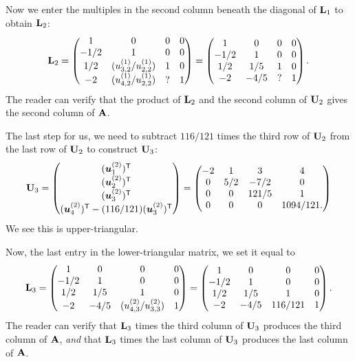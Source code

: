 Now we enter the multiples in the second column beneath the diagonal of
$\mathbf{L}_{1}$ to obtain $\mathbf{L}_{2}$:
\begin{equation}
\mathbf{L}_{2} = \begin{pmatrix}
1    & 0 & 0 & 0 \\
-1/2 & 1 & 0 & 0\\
1/2  & (u^{(1)}_{3,2}/u^{(1)}_{2,2}) & 1 & 0\\
-2   & (u^{(1)}_{4,2}/u^{(1)}_{2,2}) & ? & 1
\end{pmatrix}
=\begin{pmatrix}
1    &    0 & 0 & 0 \\
-1/2 &    1 & 0 & 0\\
1/2  &  1/5 & 1 & 0\\
-2   & -4/5 & ? & 1
\end{pmatrix}.
\end{equation}
The reader can verify that the product of $\mathbf{L}_{2}$ and the second
column of $\mathbf{U}_{2}$ gives the second column of $\mathbf{A}$.

The last step for us, we need to subtract $116/121$ times the third row
of $\mathbf{U}_{2}$ from the last row of $\mathbf{U}_{2}$ to construct
$\mathbf{U}_{3}$:
\begin{equation}
\mathbf{U}_{3} = \begin{pmatrix}(\boldsymbol{u}^{(2)}_{1})^{\mathsf{T}}\\
  (\boldsymbol{u}^{(2)}_{2})^{\mathsf{T}}\\
  (\boldsymbol{u}^{(2)}_{3})^{\mathsf{T}}\\
  (\boldsymbol{u}^{(2)}_{4})^{\mathsf{T}}-(116/121)(\boldsymbol{u}^{(2)}_{3})^{\mathsf{T}}
\end{pmatrix} =\begin{pmatrix}
    -2 &  1  &     3 &  4\\
     0 & 5/2 &  -7/2 &  0\\
     0 &  0  & 121/5 &  1\\
     0 &  0  &     0 & 1094/121.
\end{pmatrix}
\end{equation}
We see this is upper-triangular.

Now, the last entry in the lower-triangular matrix, we set it equal to
\begin{equation}
\mathbf{L}_{3} = \begin{pmatrix}
1    &    0 & 0 & 0 \\
-1/2 &    1 & 0 & 0\\
1/2  &  1/5 & 1 & 0\\
-2   & -4/5 & (u^{(2)}_{4,3}/u^{(2)}_{3,3}) & 1
\end{pmatrix} = \begin{pmatrix}
1    &    0 &       0 & 0 \\
-1/2 &    1 &       0 & 0\\
1/2  &  1/5 &       1 & 0\\
-2   & -4/5 & 116/121 & 1
\end{pmatrix}.
\end{equation}
The reader can verify that $\mathbf{L}_{3}$ times the third column of
$\mathbf{U}_{3}$ produces the third column of $\mathbf{A}$, \emph{and} that
$\mathbf{L}_{3}$ times the last column of $\mathbf{U}_{3}$ produces the last
column of $\mathbf{A}$.

